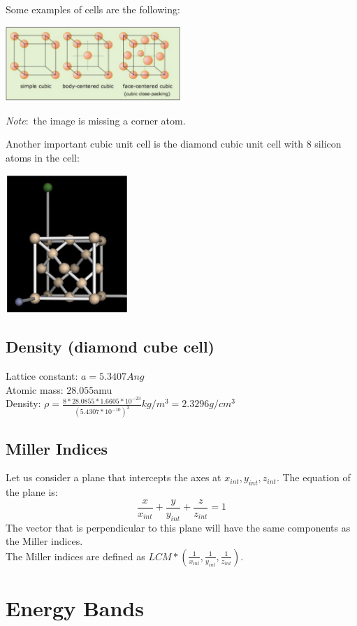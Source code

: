 \documentclass[nobib]{tufte-handout}
\newcommand{\note}[1]{
        \begin{notebox}
        \noindent\textit{Note}:\ #1
        \end{notebox}
}
\begin{document}
Some examples of cells are the following:
\begin{center}
    \includegraphics[width = 250px]{images/unit_cell_cube.png}
\end{center}
\note{the image is missing a corner atom.}
Another important cubic unit cell is the diamond cubic unit cell with 8 silicon atoms in the cell:
\begin{center}
    \includegraphics[width = 175px]{images/diamond_cube_cell.png}
\end{center}
\subsection{Density (diamond cube cell)}
Lattice constant: $a=5.3407Ang$\\ Atomic mass: $28.055$amu\\ Density: $\rho =
    \frac{8*28.0855*1.6605*10^{-23}}{(5.4307*10^{-10})^3}kg/m^3 = 2.3296g/cm^3$
\subsection{Miller Indices}
Let us consider a plane that intercepts the axes at $x_{int}, y_{int},
    z_{int}$. The equation of the plane is:
\begin{equation*}
    \frac{x}{x_{int}}+\frac{y}{y_{int}}+\frac{z}{z_{int}} = 1
\end{equation*}
The vector that is perpendicular to this plane will have the same components as the Miller indices.\\
The Miller indices are defined as $LCM*(\frac{1}{x_{int}},\frac{1}{y_{int}},\frac{1}{z_{int}})$.
\section{Energy Bands}
\end{document}
